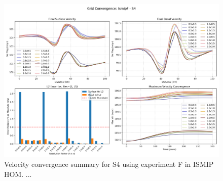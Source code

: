 \begin{figure}[H]
    \includegraphics[scale=0.49]{IsmipF_S4_convergence_summary.png}
    \caption{Velocity convergence summary for S4 using experiment F in ISMIP HOM. ... }
    \label{fig:grid_conv_S4}
\end{figure}






